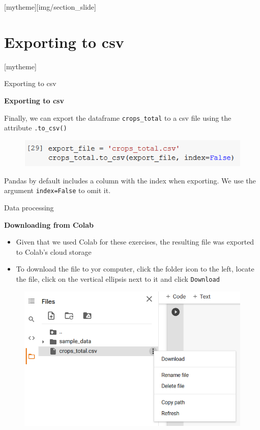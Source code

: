 \documentclass[aspectratio=169]{beamer}
\newcounter{exercises}
\newcommand{\sectionpic}[2]{
	\setbeamertemplate{section page}[mytheme][#2]
	\section{#1}
	\setbeamertemplate{section page}[mytheme]
}
\begin{document}
\sectionpic{Exporting to csv}{img/section_slide}

\begin{frame}{Exporting to csv}

	\textbf{Exporting to csv}

	Finally, we can export the dataframe \texttt{crops\_total} to a csv file using the attribute \texttt{.to\_csv()}

	\begin{figure}
		\centering
		\includegraphics[width=0.6\linewidth]{img/to_csv.png}
	\end{figure}

	Pandas by default includes a column with the index when exporting. We use the argument \texttt{index=False} to omit it.

\end{frame}

\begin{frame}{Data processing}

	\textbf{Downloading from Colab}

	\begin{itemize}
		\item Given that we used Colab for these exercises, the resulting file was exported to Colab's cloud storage
		\item To download the file to yor computer, click the folder icon to the left, locate the file, click on the vertical ellipsis next to it and click \texttt{Download}
	\end{itemize}

	\begin{figure}
		\centering
		\includegraphics[width=0.45\linewidth]{img/download_colab.png}
	\end{figure}

\end{frame}
\end{document}

